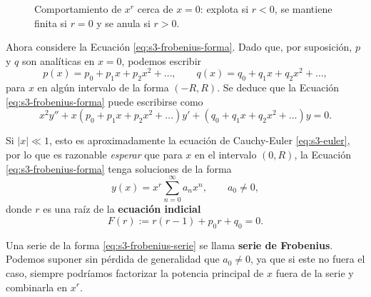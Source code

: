 \begin{figure}[H]
\centering
{}
\caption{Comportamiento de $x^r$ cerca de $x=0$: explota si $r<0$, se mantiene finita si $r=0$ y se anula si $r>0$.}
\label{fig:s3-potencias}
\end{figure}
 
Ahora considere la Ecuación \eqref{eq:s3-frobenius-forma}. Dado que, por suposición, $p$ y $q$ son analíticas en $x = 0$, podemos escribir
\begin{equation}
p(x) = p_0 + p_1 x + p_2 x^2 + \dots, \qquad q(x) = q_0 + q_1 x + q_2 x^2 + \dots,
\label{eq:s3-desarrollo-pq}
\end{equation}
para $x$ en algún intervalo de la forma $(-R, R)$. Se deduce que la Ecuación \eqref{eq:s3-frobenius-forma} puede escribirse como
\[ x^2 y'' + x(p_0 + p_1 x + p_2 x^2 + \dots)y' + (q_0 + q_1 x + q_2 x^2 + \dots)y = 0. \]
 
Si $|x| \ll 1$, esto es aproximadamente la ecuación de Cauchy-Euler \eqref{eq:s3-euler}, por lo que es razonable \textit{esperar} que para $x$ en el intervalo $(0, R)$, la Ecuación \eqref{eq:s3-frobenius-forma} tenga soluciones de la forma
\begin{equation}
y(x) = x^r \sum_{n=0}^{\infty} a_n x^n, \qquad a_0 \neq 0,
\label{eq:s3-frobenius-serie}
\end{equation}
donde $r$ es una raíz de la \textbf{ecuación indicial}
\begin{equation}
F(r):=r(r - 1) + p_0 r + q_0 = 0.
\label{eq:s3-indicial}
\end{equation}
 
Una serie de la forma \eqref{eq:s3-frobenius-serie} se llama \textbf{serie de Frobenius}. Podemos suponer sin pérdida de generalidad que $a_0 \neq 0$, ya que si este no fuera el caso, siempre podríamos factorizar la potencia principal de $x$ fuera de la serie y combinarla en $x^r$.
 
